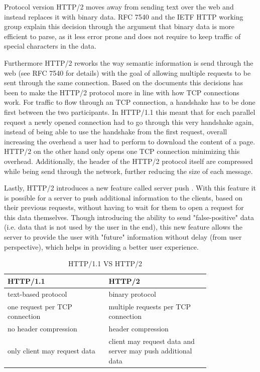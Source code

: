 \documentclass[conference]{IEEEtran}
\begin{document}
Protocol version HTTP/2 moves away from sending text over the web and instead replaces it with binary data. RFC 7540 \cite{rfc7540} and the IETF HTTP working group \cite{httpwgHTTP2} explain this decision through the argument that binary data is more efficient to parse, as it less error prone and does not require to keep traffic of special characters in the data.

Furthermore HTTP/2 reworks the way semantic information is send through the web (see RFC 7540 \cite{rfc7540} for details) with the goal of allowing multiple requests to be sent through the same connection. Based on the documents \cite{rfc7540} \cite{httpwgHTTP2} this decisions has been to make the HTTP/2 protocol more in line with how TCP connections work. For traffic to flow through an TCP connection, a handshake has to be done first between the two participants. In HTTP/1.1 this meant that for each parallel request a newly opened connection had to go through this very handshake again, instead of being able to use the handshake from the first request, overall increasing the overhead a user had to perform to download the content of a page. HTTP/2 on the other hand only opens one TCP connection minimizing this overhead. Additionally, the header of the HTTP/2 protocol itself are compressed while being send through the network, further reducing the size of each message.

Lastly, HTTP/2 introduces a new feature called server push \cite{rfc7540}. With this feature it is possible for a server to push additional information to the clients, based on their previous requests, without having to wait for them to open a request for this data themselves. Though introducing the ability to send "false-positive" data (i.e. data that is not used by the user in the end), this new feature allows the server to provide the user with "future" information without delay (from user perspective), which helps in providing a better user experience.

\begin{table}[!htbp]
	\centering
	\caption{HTTP/1.1 VS HTTP/2}
	\label{http2comparison}
	\begin{tabular}{| p{0.4\linewidth} | p{0.4\linewidth}|}\hline
		HTTP/1.1 & HTTP/2 \\\hline
		text-based protocol & binary protocol \\\hline
		one request per TCP connection & multiple requests per TCP connection \\\hline
		no header compression & header compression \\\hline
		only client may request data & client may request data and server may push additional data \\\hline
	\end{tabular}
\end{table}
\end{document}
